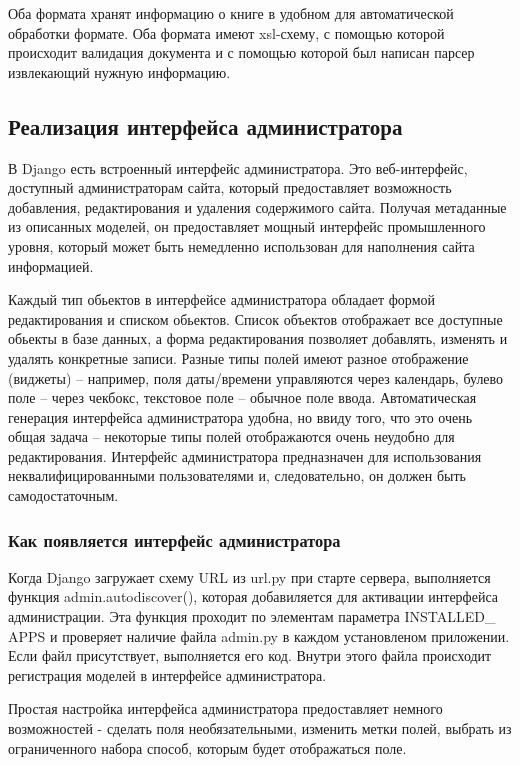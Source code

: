\documentclass[a4paper]{report}
\begin{document}
Оба формата хранят информацию о книге в удобном для автоматической обработки формате. Оба формата имеют xsl-схему, с помощью которой происходит валидация документа и с помощью которой был написан парсер извлекающий нужную информацию.

\subsection{Реализация интерфейса администратора}

В Django есть встроенный интерфейс администратора. Это веб-интерфейс, доступный администраторам сайта, который предоставляет возможность добавления, редактирования и удаления содержимого сайта. Получая метаданные из описанных моделей, он предоставляет мощный интерфейс промышленного уровня, который может быть немедленно использован для наполнения сайта информацией.

Каждый тип обьектов в интерфейсе администратора обладает формой редактирования и списком обьектов. Список объектов отображает все доступные обьекты в базе данных, а форма редактирования позволяет добавлять, изменять и удалять конкретные записи. 
Разные типы полей имеют разное отображение (виджеты) -- например, поля даты/времени управляются через календарь, булево поле -- через чекбокс, текстовое поле -- обычное поле ввода. 
Автоматическая генерация интерфейса администратора удобна, но ввиду того, что это очень общая задача -- некоторые типы полей отображаются очень неудобно для редактирования. Интерфейс администратора предназначен для использования неквалифицированными пользователями и, следовательно, он должен быть самодостаточным.

\subsubsection{Как появляется интерфейс администратора}

Когда Django загружает схему URL из url.py  при старте сервера, выполняется функция admin.autodiscover(), которая добавиляется для активации интерфейса администрации. Эта функция проходит по элементам параметра INSTALLED\_ APPS и проверяет наличие файла admin.py в каждом установленом приложении. Если файл присутствует, выполняется его код. Внутри этого файла происходит регистрация моделей в интерфейсе администратора. %

Простая настройка интерфейса администратора предоставляет немного возможностей - сделать поля необязательными, изменить метки полей, выбрать из ограниченного набора способ, которым будет отображаться поле.
\end{document}

